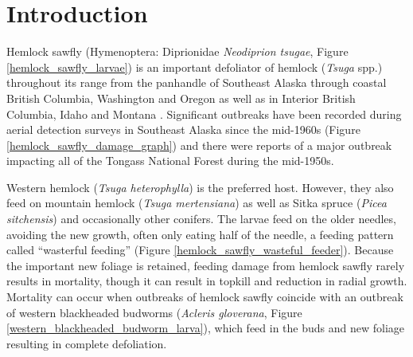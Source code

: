 \section{Introduction}

Hemlock sawfly (Hymenoptera: Diprionidae \textit{Neodiprion tsugae}, Figure \ref{hemlock_sawfly_larvae}) is an important defoliator of hemlock (\textit{Tsuga} spp.)  throughout its range from the panhandle of Southeast Alaska through coastal British Columbia, Washington and Oregon as well as in Interior British Columbia, Idaho and Montana \citep{Hardetal1976}.  Significant outbreaks have been recorded during aerial detection surveys in Southeast Alaska since the mid-1960s (Figure \ref{hemlock_sawfly_damage_graph}) and there were reports of a major outbreak impacting all of the Tongass National Forest during the mid-1950s. 

Western hemlock (\textit{Tsuga heterophylla}) is the preferred host. However, they also feed on mountain hemlock (\textit{Tsuga mertensiana}) as well as Sitka spruce (\textit{Picea sitchensis}) and occasionally other conifers.  The larvae feed on the older needles, avoiding the new growth, often only eating half of the needle, a feeding pattern called “wasterful feeding” (Figure \ref{hemlock_sawfly_wasteful_feeder}).  Because the important new foliage is retained, feeding damage from hemlock sawfly rarely results in mortality, though it can result in topkill and reduction in radial growth.  Mortality can occur when outbreaks of hemlock sawfly coincide with an outbreak of western blackheaded budworms (\textit{Acleris gloverana}, Figure \ref{western_blackheaded_budworm_larva}), which feed in the buds and new foliage resulting in complete defoliation. 

